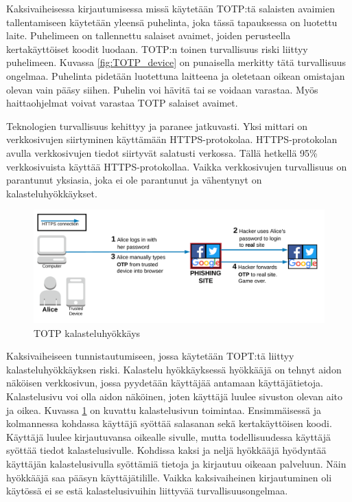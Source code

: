 Kaksivaiheisessa kirjautumisessa missä käytetään TOTP:tä salaisten avaimien tallentamiseen käytetään yleensä puhelinta, joka tässä tapauksessa on luotettu laite. Puhelimeen on tallennettu salaiset avaimet, joiden perusteella kertakäyttöiset koodit luodaan. TOTP:n toinen turvallisuus riski liittyy puhelimeen. Kuvassa \ref{fig:TOTP_device} on punaisella merkitty tätä turvallisuus ongelmaa. Puhelinta pidetään luotettuna laitteena ja oletetaan oikean omistajan olevan vain pääsy siihen. Puhelin voi hävitä tai se voidaan varastaa. Myös haittaohjelmat voivat varastaa TOTP salaiset avaimet. 



Teknologien turvallisuus kehittyy ja paranee jatkuvasti. Yksi mittari on verkkosivujen siirtyminen käyttämään HTTPS-protokolaa. HTTPS-protokolan avulla verkkosivujen tiedot siirtyvät salatusti verkossa. Tällä hetkellä 95\% verkkosivuista käyttää HTTPS-protokollaa. Vaikka verkkosivujen turvallisuus on parantunut yksiasia, joka ei ole parantunut ja vähentynyt on kalasteluhyökkäykset. \citep{google_transparency_report} \citep{phishing_scams}

\begin{figure}[ht]
    \centering
    \includegraphics[width=15cm]{template/figures/totp phishing attack.png}
    \caption{TOTP kalasteluhyökkäys \citep{TOTP}}
    \label{fig:TOTP_phishing}
\end{figure}

Kaksivaiheiseen tunnistautumiseen, jossa käytetään TOPT:tä liittyy kalasteluhyökkäyksen riski. Kalastelu hyökkäyksessä hyökkääjä on tehnyt aidon näköisen verkkosivun, jossa pyydetään käyttäjää antamaan käyttäjätietoja. Kalastelusivu voi olla aidon näköinen, joten käyttäjä luulee sivuston olevan aito ja oikea. Kuvassa \ref{fig:TOTP_phishing} on kuvattu kalastelusivun toimintaa. Ensimmäisessä ja kolmannessa kohdassa käyttäjä syöttää salasanan sekä kertakäyttöisen koodi. Käyttäjä luulee kirjautuvansa oikealle sivulle, mutta todellisuudessa käyttäjä syöttää tiedot kalastelusivulle. Kohdissa kaksi ja neljä hyökkääjä hyödyntää käyttäjän kalastelusivulla syöttämiä tietoja ja kirjautuu oikeaan palveluun. Näin hyökkääjä saa pääsyn käyttäjätilille. Vaikka kaksivaiheinen kirjautuminen oli käytössä ei se estä kalastelusivuihin liittyvää turvallisuusongelmaa. 

